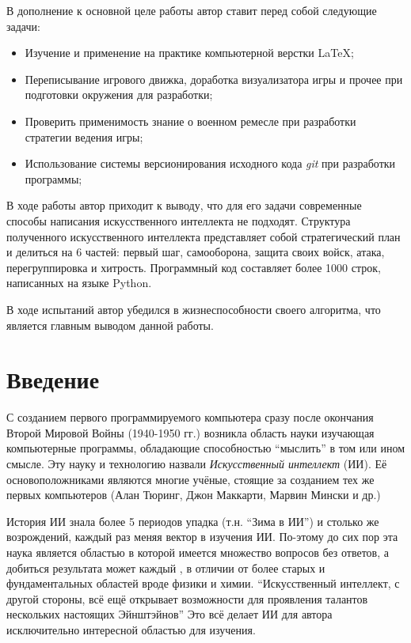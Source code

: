 \documentclass[12pt]{report}
\newenvironment{myItemize}{
	\begin{itemize}
  		\setlength{\itemsep}{1pt}
  		\setlength{\parskip}{0pt}
  		\setlength{\parsep}{0pt}
}{\end{itemize}}
\begin{document}
В дополнение к основной целе работы автор ставит перед собой следующие задачи:
\begin{myItemize}
\item Изучение и применение на практике компьютерной верстки \LaTeX;
\item Переписывание игрового движка, доработка визуализатора игры и прочее при подготовки окружения для разработки;
\item Проверить применимость знание о военном ремесле при разработки стратегии ведения игры;
\item Использование системы версионирования исходного кода \emph{git} при разработки программы; 
\end{myItemize}

В ходе работы автор приходит к выводу, что для его задачи современные способы написания искусственного интеллекта не подходят. Структура полученного искусственного интеллекта представляет собой стратегический план и делиться на 6 частей: первый шаг, самооборона, защита своих войск, атака, перегруппировка и хитрость. Программный код составляет более 1000 строк, написанных на языке Python.

В ходе испытаний автор убедился в жизнеспособности своего алгоритма, что является главным выводом данной работы.


\chapter*{Введение}
\thispagestyle{fancy}

С созданием первого программируемого компьютера сразу после окончания Второй Мировой Войны (1940-1950 гг.) возникла область науки изучающая компьютерные программы, обладающие способностью ``мыслить'' в том или ином смысле. Эту науку и технологию назвали \emph{Искусственный интеллект} (ИИ). Её основоположниками являются многие учёные, стоящие за созданием тех же первых компьютеров (Алан Тюринг, Джон Маккарти, Марвин Мински и др.)

История ИИ знала более 5 периодов упадка (т.н. ``Зима в ИИ'') и столько же возрождений, каждый раз меняя вектор в изучения ИИ. По-этому до сих пор эта наука является областью в которой имеется множество вопросов без ответов, а добиться результата может каждый \citep{russell1995}, в отличии от более старых и фундаментальных областей вроде физики и химии. ``Искусственный интеллект, с другой стороны, всё ещё открывает возможности для проявления талантов нескольких настоящих Эйнштэйнов'' \citep{russell1995} Это всё делает ИИ для автора исключительно интересной областью для изучения.
\end{document}
